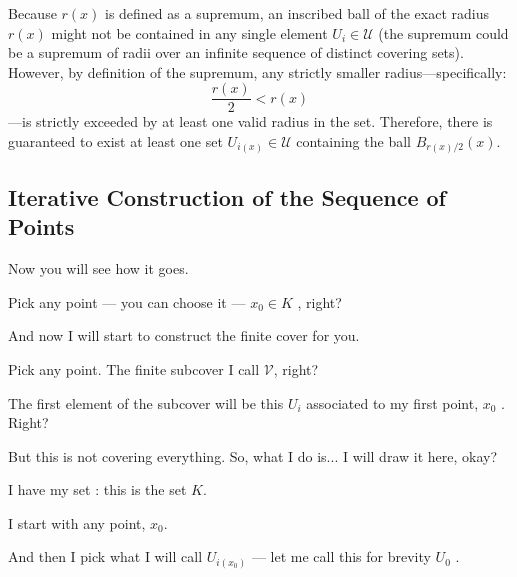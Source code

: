 \begin{proofWrapper}
\begin{content}
\begin{steps}
Because $r(x)$ is defined as a supremum, an inscribed ball of the exact radius $r(x)$ might not be contained in any single element $U_i \in \mathcal{U}$ (the supremum could be a supremum of radii over an infinite sequence of distinct covering sets). However, by definition of the supremum, any strictly smaller radius---specifically:
\[
\frac{r(x)}{2} < r(x)
\]
---is strictly exceeded by at least one valid radius in the set. Therefore, there is guaranteed to exist at least one set $U_{i(x)} \in \mathcal{U}$ containing the ball $B_{r(x)/2}(x)$.
\end{steps}
\end{content}

\begin{hidden}
\end{hidden}

\subsection{Iterative Construction of the Sequence of Points}

\begin{speech}[01:14:45 - 01:16:31]
Now you will see how it goes.

Pick any point --- you can choose it --- $x_0 \in K$ , right?

And now I will start to construct the finite cover for you.

Pick any point. The finite subcover I call $\mathcal{V}$, right?

The first element of the subcover will be this $U_i$ associated to my first point, $x_0$ . Right?

But this is not covering everything. So, what I do is... I will draw it here, okay?

I have my set : this is the set $K$.

I start with any point, $x_0$.

And then I pick what I will call $U_{i(x_0)}$ --- let me call this for brevity $U_0$ .


\end{speech}
\end{proofWrapper}
